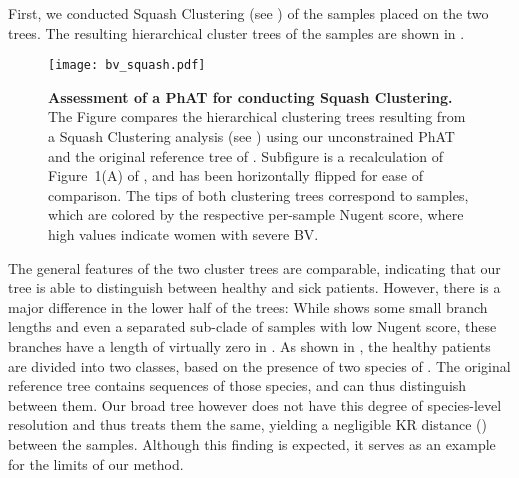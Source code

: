 First, we conducted Squash Clustering \cite{Matsen2011a}
(see )
of the samples placed on the two trees.
The resulting hierarchical cluster trees of the samples are shown in .

\begin{figure}[hpbt]
    \centering
    \texttt{[image: bv\_squash.pdf]}
    \begin{subfigure}{0pt}
        \label{fig:bv_squash:sub:squash_art}
    \end{subfigure}
    \begin{subfigure}{0pt}
        \label{fig:bv_squash:sub:squash_orig}
    \end{subfigure}
    \caption[Assessment of a \acs{PhAT} for conducting Squash Clustering]{
        \textbf{Assessment of a \acs{PhAT} for conducting Squash Clustering.}
        The Figure compares the hierarchical clustering trees resulting from a Squash Clustering analysis
        (see )
        using   our unconstrained  \acs{PhAT} and
         the original reference tree of .
        Subfigure  is a recalculation of Figure~1(A) of ,
        and has been horizontally flipped for ease of comparison.
        The tips of both clustering trees correspond to samples,
        which are colored by the respective per-sample Nugent score,
        where high values indicate women with severe \acl{BV}.
    }
    \label{fig:bv_squash}
\end{figure}

The general features of the two cluster trees are comparable,
indicating that our tree is able to distinguish between healthy and sick patients.
However, there is a major difference in the lower half of the trees:
While  shows some small branch lengths and even a separated sub-clade
of samples with low Nugent score,
these branches have a length of virtually zero in .
As shown in \cite{Srinivasan2012}, the healthy patients are divided into two classes,
based on the presence of two species of .
The original reference tree contains sequences of those species, and can thus distinguish between them.
Our broad  tree however
does not have this degree of species-level resolution and thus treats them the same,
yielding a negligible KR distance ()
between the samples.
Although this finding is expected, it serves as an example for the limits of our method.

